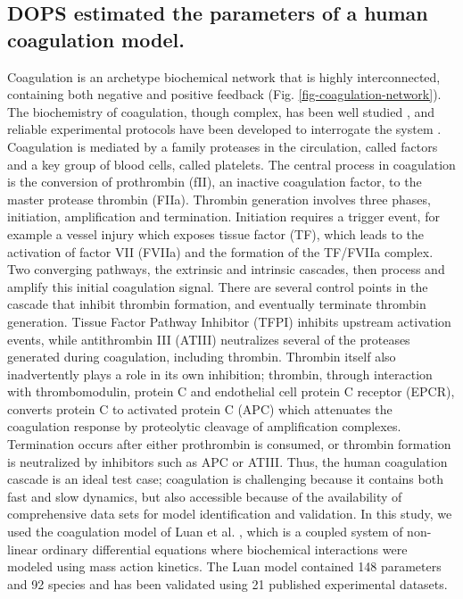 \documentclass{bmcart}
\begin{document}
\subsection*{DOPS estimated the parameters of a human coagulation model.}
Coagulation is an archetype biochemical network that is highly interconnected, containing both negative and positive feedback (Fig. \ref{fig-coagulation-network}).
The biochemistry of coagulation, though complex, has been well studied \cite{mann2003dynamics,mann2003all,mann2003thrombin,vogler2009contact,diamond2013systems,fogelson2005coagulation,anand2003model},
and reliable experimental protocols have been developed to interrogate the system \cite{hockin2002model,chatterjee2010systems,mann2006models,luan2007computationally}.
Coagulation is mediated by a family proteases in the circulation, called factors and a key group of blood cells, called platelets.
The central process in coagulation is the conversion of prothrombin (fII), an inactive coagulation factor, to the master protease thrombin (FIIa).
Thrombin generation involves three phases, initiation, amplification and termination.
Initiation requires a trigger event, for example a vessel injury which exposes tissue factor (TF), which leads to the activation of factor VII (FVIIa) and the formation of the TF/FVIIa complex.
Two converging pathways, the extrinsic and intrinsic cascades, then process and amplify this initial coagulation signal.
There are several control points in the cascade that inhibit thrombin formation, and eventually terminate thrombin generation.
Tissue Factor Pathway Inhibitor (TFPI) inhibits upstream activation events, while antithrombin III (ATIII) neutralizes several of the proteases generated during coagulation, including thrombin.
Thrombin itself also inadvertently plays a role in its own inhibition; thrombin, through interaction with thrombomodulin, protein C and endothelial cell protein C receptor (EPCR), converts protein C to activated protein C (APC) which attenuates the coagulation response by proteolytic cleavage of amplification complexes.
Termination occurs after either prothrombin is consumed, or thrombin formation is neutralized by inhibitors such as APC or ATIII.
Thus, the human coagulation cascade is an ideal test case;
coagulation is challenging because it contains both fast and slow dynamics, but also accessible because of the availability of comprehensive data sets for model identification and validation.
In this study, we used the coagulation model of Luan et al. \cite{luan2007computationally}, which is a coupled system of non-linear ordinary differential equations where biochemical interactions were modeled using mass action kinetics.
The Luan model contained 148 parameters and 92 species and has been validated using 21 published experimental datasets.
\end{document}
